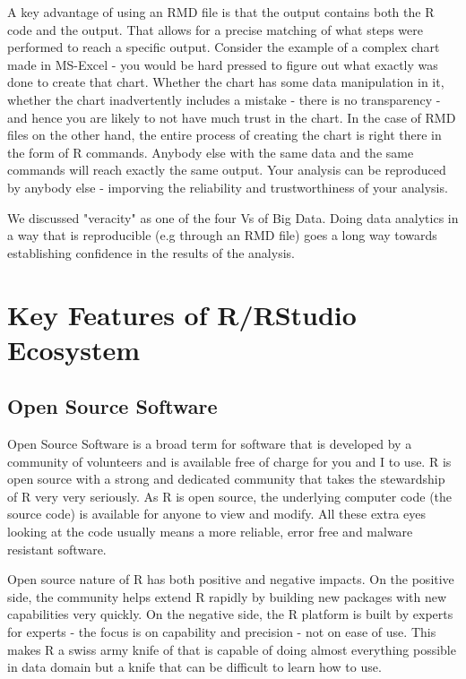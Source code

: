 \documentclass[10pt, letterpaper, twoside]{memoir}\usepackage{knitr}
\begin{document}
A key advantage of using an RMD file is that the output contains both the R code and the output. That allows for a precise matching of what steps were performed to reach a specific output. Consider the example of a complex chart made in MS-Excel - you would be hard pressed to figure out what exactly was done to create that chart. Whether the chart has some data manipulation in it, whether the chart inadvertently includes a mistake - there is no transparency - and hence you are likely to not have much trust in the chart. In the case of RMD files on the other hand, the entire process of creating the chart is right there in the form of R commands. Anybody else with the same data and the same commands will reach exactly the same output. Your analysis can be reproduced by anybody else - imporving the reliability and trustworthiness of your analysis.

We discussed "veracity" as one of the four Vs of Big Data. Doing data analytics in a way that is reproducible (e.g through an RMD file) goes a long way towards establishing confidence in the results of the analysis.

\section{Key Features of R/RStudio Ecosystem}

\subsection{Open Source Software}

Open Source Software is a broad term for software that is developed by a community of volunteers and is available free of charge for you and I to use. R is open source with a strong and dedicated community that takes the stewardship of R very very seriously. 
As R is open source, the underlying computer code (the source code) is available for anyone to view and modify. All these extra eyes looking at the code usually means a more reliable, error free and malware resistant software. 

Open source nature of R has both positive and negative impacts. On the positive side, the community helps extend R rapidly by building new packages with new capabilities very quickly. On the negative side, the R platform is built by experts for experts - the focus is on capability and precision - not on ease of use. This makes R a swiss army knife of that is capable of doing almost everything possible in data domain but a knife that can be difficult to learn how to use.
\end{document}
